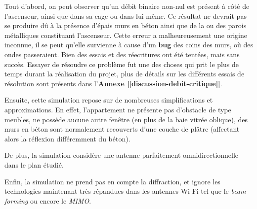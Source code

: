 Tout d'abord, on peut observer qu'un débit binaire non-nul est présent à côté de l'ascenseur, ainsi que dans sa cage ou dans lui-même. Ce résultat ne devrait pas se produire dû à la présence d'épais murs en béton ainsi que de la ou des parois métalliques constituant l'ascenseur. Cette erreur a malheureusement une origine inconnue, il se peut qu'elle survienne à cause d'un \textbf{bug} des coins des murs, où des ondes passeraient. Bien des essais et des réecritures ont été tentées, mais sans succès. Essayer de résoudre ce problème fut une des choses qui prit le plus de temps durant la réalisation du projet, plus de détails sur les différents essais de résolution sont présents dans l'\textbf{Annexe [\ref{discussion-debit-critique}]}.

Ensuite, cette simulation repose sur de nombreuses simplifications et approximations. En effet, l'appartement ne présente pas d'obstacle de type meubles, ne possède aucune autre fenêtre (en plus de la baie vitrée oblique), des murs en béton sont normalement recouverts d'une couche de plâtre (affectant alors la réflexion différemment du béton). 

De plus, la simulation considère une antenne parfaitement omnidirectionnelle dans le plan étudié. 

Enfin, la simulation ne prend pas en compte la diffraction, et ignore les technologies maintenant très répandues dans les antennes Wi-Fi tel que le \textit{beam-forming} ou encore le \textit{MIMO}.
